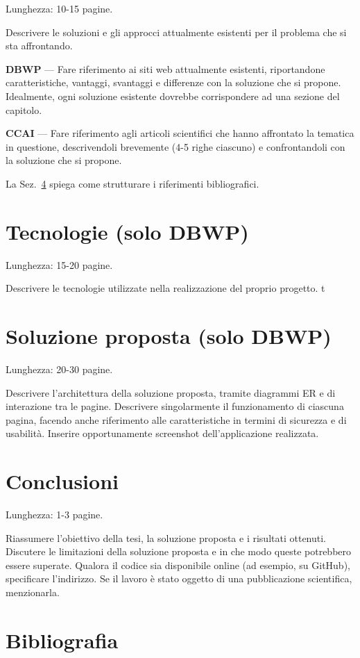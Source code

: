 Lunghezza: 10-15 pagine.

Descrivere le soluzioni e gli approcci attualmente esistenti per il problema che si sta affrontando.

\textbf{DBWP} --- Fare riferimento ai siti web attualmente esistenti, riportandone caratteristiche, vantaggi, svantaggi e differenze con la soluzione che si propone. Idealmente, ogni soluzione esistente dovrebbe corrispondere ad una sezione del capitolo.

\textbf{CCAI} --- Fare riferimento agli articoli scientifici che hanno affrontato la tematica in questione, descrivendoli brevemente (4-5 righe ciascuno) e confrontandoli con la soluzione che si propone.

La Sez.~\ref{sec:bibliografia} spiega come strutturare i riferimenti bibliografici.

\section{Tecnologie (solo DBWP)}

Lunghezza: 15-20 pagine.

Descrivere le tecnologie utilizzate nella realizzazione del proprio progetto.
t
\section{Soluzione proposta (solo DBWP)}

Lunghezza: 20-30 pagine.

Descrivere l'architettura della soluzione proposta, tramite diagrammi ER e di interazione tra le pagine. Descrivere singolarmente il funzionamento di ciascuna pagina, facendo anche riferimento alle caratteristiche in termini di sicurezza e di usabilità. Inserire opportunamente screenshot dell'applicazione realizzata. 


\section{Conclusioni}

Lunghezza: 1-3 pagine.

Riassumere l'obiettivo della tesi, la soluzione proposta e i risultati ottenuti. Discutere le limitazioni della soluzione proposta e in che modo queste potrebbero essere superate. Qualora il codice sia disponibile online (ad esempio, su GitHub), specificare l'indirizzo. Se il lavoro è stato oggetto di una pubblicazione scientifica, menzionarla.

\section{Bibliografia}
\label{sec:bibliografia}

